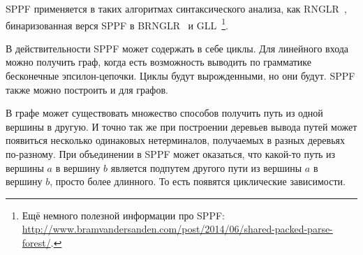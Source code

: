 SPPF применяется в таких алгоритмах синтаксического анализа, как RNGLR~\cite{Scott:2006:RNG:1146809.1146810}, бинаризованная верся SPPF в BRNGLR~\cite{Scott:2007:BCT:1289813.1289815} и GLL~\cite{Scott:2010:GP:1860132.1860320,10.1007/978-3-662-46663-6_5}\footnote{Ещё немного полезной информации про SPPF: \url{http://www.bramvandersanden.com/post/2014/06/shared-packed-parse-forest/}.}.

В действительности SPPF может содержать в себе циклы. Для линейного входа можно получить граф, когда есть возможность выводить по грамматике бесконечные эпсилон-цепочки. Циклы будут вырожденными, но они будут. SPPF также можно построить и для графов.

В графе может существовать множество способов получить путь из одной вершины в другую. И точно так же при построении деревьев вывода путей может появиться несколько одинаковых нетерминалов, получаемых в разных деревьях по-разному. При объединении в SPPF может оказаться, что какой-то путь из вершины $a$ в вершину $b$ является подпутем другого пути из вершины $a$ в вершину $b$, просто более длинного. То есть появятся циклические зависимости.


